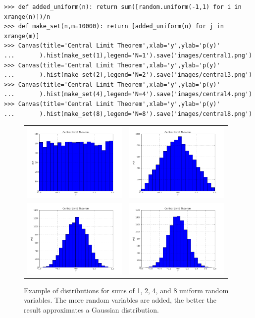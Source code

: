 \documentclass[justified,sixbynine]{tufte-book}
\def\ft{\small\tt}
\theoremstyle{plain}%
\theoremstyle{definition}
\theoremstyle{remark}
\begin{document}
\begin{fullwidth}
\begin{lstlisting}[caption={in file: {\ft nlib.py}}]
>>> def added_uniform(n): return sum([random.uniform(-1,1) for i in xrange(n)])/n
>>> def make_set(n,m=10000): return [added_uniform(n) for j in xrange(m)]
>>> Canvas(title='Central Limit Theorem',xlab='y',ylab='p(y)'
...       ).hist(make_set(1),legend='N=1').save('images/central1.png')
>>> Canvas(title='Central Limit Theorem',xlab='y',ylab='p(y)'
...       ).hist(make_set(2),legend='N=2').save('images/central3.png')
>>> Canvas(title='Central Limit Theorem',xlab='y',ylab='p(y)'
...       ).hist(make_set(4),legend='N=4').save('images/central4.png')
>>> Canvas(title='Central Limit Theorem',xlab='y',ylab='p(y)'
...       ).hist(make_set(8),legend='N=8').save('images/central8.png')
\end{lstlisting}
\begin{figure}[ht]
\begin{center}
\begin{tabular}{cc}
\includegraphics[width=2in]{images/central1.png} &
\includegraphics[width=2in]{images/central2.png} \\
\includegraphics[width=2in]{images/central4.png} &
\includegraphics[width=2in]{images/central8.png}
\end{tabular}
\end{center}
\caption{Example of distributions for sums of 1, 2, 4, and 8 uniform random variables. The more random variables are added, the better the result approximates a Gaussian distribution.\label{central}}
\end{figure}


\end{fullwidth}
\end{document}
